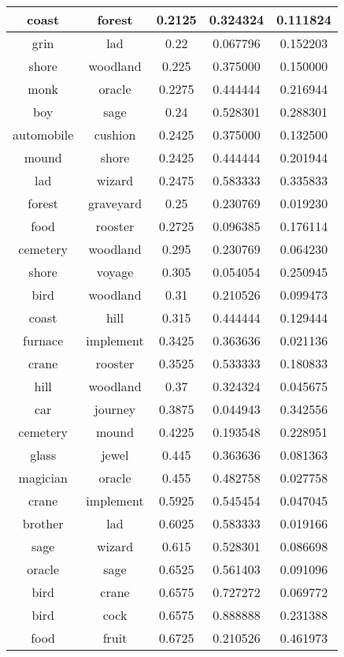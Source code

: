 \begin{table}[p]
\begin{center}
{\begin{tabular}{|c|c|c|c|c|}
\hline
coast & forest & 0.2125 & 0.324324 & 0.111824 \\
\hline
grin & lad & 0.22 & 0.067796 & 0.152203 \\
\hline
shore & woodland & 0.225 & 0.375000 & 0.150000 \\
\hline
monk & oracle & 0.2275 & 0.444444 & 0.216944 \\
\hline
boy & sage & 0.24 & 0.528301 & 0.288301 \\
\hline
automobile & cushion & 0.2425 & 0.375000 & 0.132500 \\
\hline
mound & shore & 0.2425 & 0.444444 & 0.201944 \\
\hline
lad & wizard & 0.2475 & 0.583333 & 0.335833 \\
\hline
forest & graveyard & 0.25 & 0.230769 & 0.019230 \\
\hline
food & rooster & 0.2725 & 0.096385 & 0.176114 \\
\hline
cemetery & woodland & 0.295 & 0.230769 & 0.064230 \\
\hline
shore & voyage & 0.305 & 0.054054 & 0.250945 \\
\hline
bird & woodland & 0.31 & 0.210526 & 0.099473 \\
\hline
coast & hill & 0.315 & 0.444444 & 0.129444 \\
\hline
furnace & implement & 0.3425 & 0.363636 & 0.021136 \\
\hline
crane & rooster & 0.3525 & 0.533333 & 0.180833 \\
\hline
hill & woodland & 0.37 & 0.324324 & 0.045675 \\
\hline
car & journey & 0.3875 & 0.044943 & 0.342556 \\
\hline
cemetery & mound & 0.4225 & 0.193548 & 0.228951 \\
\hline
glass & jewel & 0.445 & 0.363636 & 0.081363 \\
\hline
magician & oracle & 0.455 & 0.482758 & 0.027758 \\
\hline
crane & implement & 0.5925 & 0.545454 & 0.047045 \\
\hline
brother & lad & 0.6025 & 0.583333 & 0.019166 \\
\hline
sage & wizard & 0.615 & 0.528301 & 0.086698 \\
\hline
oracle & sage & 0.6525 & 0.561403 & 0.091096 \\
\hline
bird & crane & 0.6575 & 0.727272 & 0.069772 \\
\hline
bird & cock & 0.6575 & 0.888888 & 0.231388 \\
\hline
food & fruit & 0.6725 & 0.210526 & 0.461973 \\

\end{tabular}}
\end{center}
\end{table}

